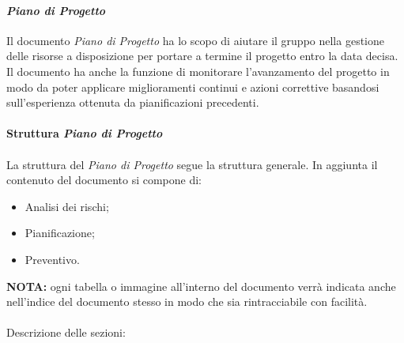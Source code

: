 \paragraph{\textit{Piano di Progetto}}

Il documento \textit{\textit{Piano di Progetto}} ha lo scopo di aiutare il gruppo nella gestione delle risorse a disposizione per portare a termine il progetto entro la data decisa.
Il documento ha anche la funzione di monitorare l'avanzamento del progetto in modo da poter applicare miglioramenti continui e azioni correttive
basandosi sull'esperienza ottenuta da pianificazioni precedenti.
\\\\
\textbf{Struttura \textit{\textit{Piano di Progetto}}}
\\\\
La struttura del \textit{\textit{Piano di Progetto}} segue la struttura generale.
In aggiunta il contenuto del documento si compone di:
\begin{itemize}
    \item Analisi dei rischi;
    \item Pianificazione;
    \item Preventivo.
\end{itemize}
\textbf{NOTA:} ogni tabella o immagine all'interno del documento verrà indicata anche nell'indice del documento stesso in modo che sia rintracciabile con 
facilità.
\\\\
Descrizione delle sezioni:
